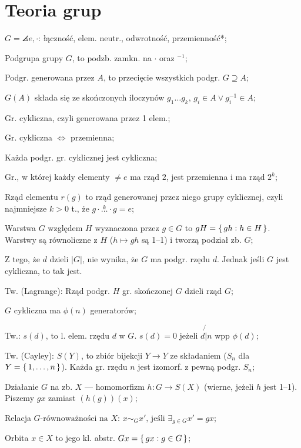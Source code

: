 \section{Teoria grup}

$G = \angles{e, \cdot}$: łączność, elem. neutr., odwrotność, przemienność*;

Podgrupa grupy $G$, to podzb. zamkn. na $\cdot$ oraz $^{-1}$;

Podgr. generowana przez $A$, to przecięcie wszystkich podgr. $G \supseteq A$;

$G(A)$ składa się ze skończonych iloczynów $g_1\dots g_k$,
  $g_i\in A \lor g_i^{-1} \in A$;

Gr. cykliczna, czyli generowana przez 1 elem.;

Gr. cykliczna $\Leftrightarrow$ przemienna;

Każda podgr. gr. cyklicznej jest cykliczna;

Gr., w której każdy elementy $\neq e$ ma rząd $2$, jest przemienna
  i ma rząd $2^k$;

Rząd elementu $r(g)$ to rząd generowanej przez niego grupy cyklicznej, czyli
najmniejsze $k > 0$ t., że $g\cdot\overset{k}{\ldots}\cdot g=e$;

Warstwa $G$ względem $H$ wyznaczona przez $g\in G$ to
  $gH = \set{gh : h \in H}$. Warstwy są równoliczne z $H$
  ($h \mapsto gh$ są 1--1) i tworzą podział zb. $G$;

Z tego, że $d$ dzieli $|G|$, nie wynika, że $G$ ma podgr. rzędu $d$. Jednak
jeśli $G$ jest cykliczna, to tak jest.

Tw. (Lagrange): Rząd podgr. $H$ gr. skończonej $G$ dzieli rząd $G$;

$G$ cykliczna ma $\phi(n)$ generatorów;

Tw.: $s(d)$, to l. elem. rzędu $d$ w $G$. $s(d) = 0$ jeżeli $d \not{|} n$
  wpp $\phi(d)$;

Tw. (Cayley): $S(Y)$, to zbiór bijekcji $Y \rightarrow Y$ ze składaniem
  ($S_n$ dla $Y=\set{1,\dots,n}$). Każda gr. rzędu $n$ jest izomorf. z pewną
  podgr. $S_n$;

Działanie $G$ na zb. $X$ --- homomorfizm $h: G \rightarrow S(X)$ (wierne,
jeżeli $h$ jest 1--1). Piszemy $gx$ zamiast $(h(g))(x)$;

Relacja $G\text{-równoważności na } X$:
  $x \sim_G x' \text{, jeśli } \exists_{g\in G} x' = gx$;

Orbita $x \in X$ to jego kl. abstr. $Gx=\set{gx:g\in G}$;

